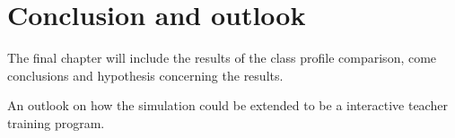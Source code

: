 \chapter{Conclusion and outlook}
The final chapter will include the results of the class profile comparison,
come conclusions and hypothesis concerning the results.

An outlook on how the simulation could be extended to be a interactive teacher
training program.
